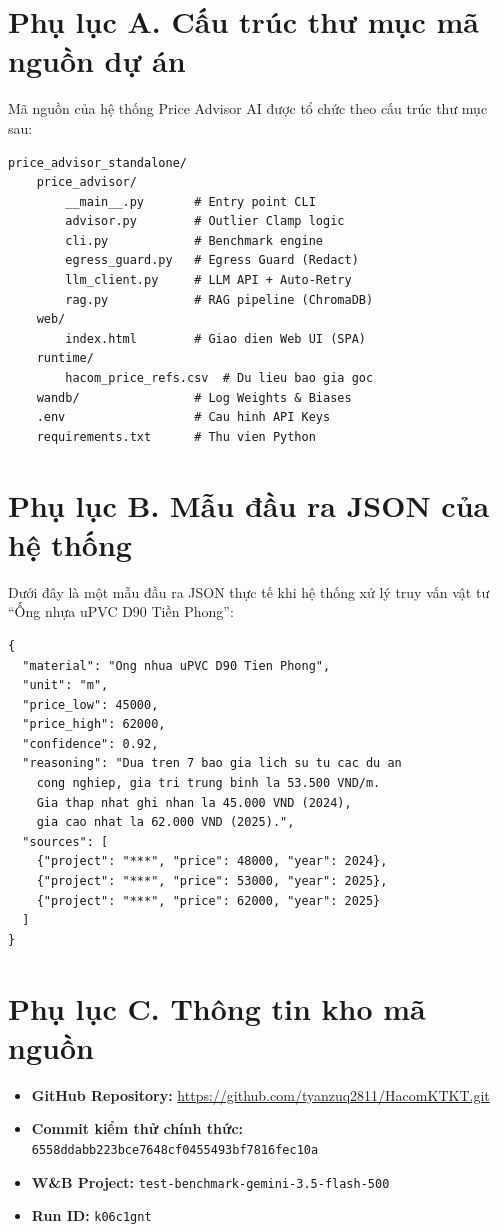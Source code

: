 \appendix
{}

\section*{Phụ lục A. Cấu trúc thư mục mã nguồn dự án}

Mã nguồn của hệ thống Price Advisor AI được tổ chức theo cấu trúc thư mục sau:

\begin{lstlisting}[caption=Cấu trúc thư mục mã nguồn Price Advisor AI]
price_advisor_standalone/
    price_advisor/
        __main__.py       # Entry point CLI
        advisor.py        # Outlier Clamp logic
        cli.py            # Benchmark engine
        egress_guard.py   # Egress Guard (Redact)
        llm_client.py     # LLM API + Auto-Retry
        rag.py            # RAG pipeline (ChromaDB)
    web/
        index.html        # Giao dien Web UI (SPA)
    runtime/
        hacom_price_refs.csv  # Du lieu bao gia goc
    wandb/                # Log Weights & Biases
    .env                  # Cau hinh API Keys
    requirements.txt      # Thu vien Python
\end{lstlisting}

\section*{Phụ lục B. Mẫu đầu ra JSON của hệ thống}

Dưới đây là một mẫu đầu ra JSON thực tế khi hệ thống xử lý truy vấn vật tư ``Ống nhựa uPVC D90 Tiền Phong'':

\begin{lstlisting}[caption=Mẫu đầu ra JSON từ Price Advisor AI]
{
  "material": "Ong nhua uPVC D90 Tien Phong",
  "unit": "m",
  "price_low": 45000,
  "price_high": 62000,
  "confidence": 0.92,
  "reasoning": "Dua tren 7 bao gia lich su tu cac du an 
    cong nghiep, gia tri trung binh la 53.500 VND/m. 
    Gia thap nhat ghi nhan la 45.000 VND (2024), 
    gia cao nhat la 62.000 VND (2025).",
  "sources": [
    {"project": "***", "price": 48000, "year": 2024},
    {"project": "***", "price": 53000, "year": 2025},
    {"project": "***", "price": 62000, "year": 2025}
  ]
}
\end{lstlisting}

\section*{Phụ lục C. Thông tin kho mã nguồn}

\begin{itemize}
    \item \textbf{GitHub Repository:} \url{https://github.com/tyanzuq2811/HacomKTKT.git}
    \item \textbf{Commit kiểm thử chính thức:} \texttt{6558ddabb223bce7648cf0455493bf7816fec10a}
    \item \textbf{W\&B Project:} \texttt{test-benchmark-gemini-3.5-flash-500}
    \item \textbf{Run ID:} \texttt{k06c1gnt}
\end{itemize}
